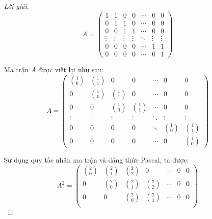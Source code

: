 \documentclass[class=nhvh-linear-algebra,crop=false]{standalone}
\begin{document}
\begin{proof}[Lời giải]
    \[
        A =
        \begin{pmatrix}
            1      & 1      & 0      & 0      & \cdots & 0      & 0      \\
            0      & 1      & 1      & 0      & \cdots & 0      & 0      \\
            0      & 0      & 1      & 1      & \cdots & 0      & 0      \\
            \vdots & \vdots & \vdots & \vdots & \ddots & \vdots & \vdots \\
            0      & 0      & 0      & 0      & \cdots & 1      & 1      \\
            0      & 0      & 0      & 0      & \cdots & 0      & 1
        \end{pmatrix}
    \]
    \par Ma trận $A$ được viết lại như sau:
    \[
        A =
        \begin{pmatrix}
            \binom{1}{0} & \binom{1}{1} & 0            & 0            & \cdots & 0            & 0            \\
            0            & \binom{1}{0} & \binom{1}{1} & 0            & \cdots & 0            & 0            \\
            0            & 0            & \binom{1}{0} & \binom{1}{1} & \cdots & 0            & 0            \\
            \vdots       & \vdots       & \vdots       & \vdots       & \ddots & \vdots       & \vdots       \\
            0            & 0            & 0            & 0            & \ddots & \binom{1}{0} & \binom{1}{1} \\
            0            & 0            & 0            & 0            & \cdots & 0            & \binom{1}{0}
        \end{pmatrix}
    \]
    \par Sử dụng quy tắc nhân ma trận và đẳng thức Pascal, ta được:
    \[
        A^{2} =
        \begin{pmatrix}
            \binom{2}{0} & \binom{2}{1} & \binom{2}{2} & 0            & \cdots & 0            & 0            \\
            0            & \binom{2}{0} & \binom{2}{1} & \binom{2}{2} & \cdots & 0            & 0            \\
            0            & 0            & \binom{2}{0} & \binom{2}{1} & \cdots & 0            & 0            \\

\end{pmatrix}\]
\end{proof}
\end{document}
